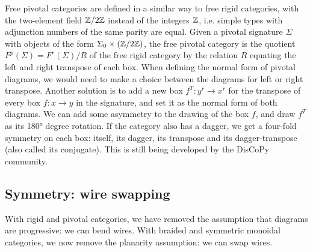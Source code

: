 Free pivotal categories are defined in a similar way to free rigid categories, with the two-element field $\mathbb{Z} / 2 \mathbb{Z}$ instead of the integers $\mathbb{Z}$, i.e. simple types with adjunction numbers of the same parity are equal.
Given a pivotal signature $\Sigma$ with objects of the form $\Sigma_0 \times (\mathbb{Z} / 2 \mathbb{Z})$, the free pivotal category is the quotient $F^p(\Sigma) = F^r(\Sigma) / R$ of the free rigid category by the relation $R$ equating the left and right transpose of each box.
When defining the normal form of pivotal diagrams, we would need to make a choice between the diagrams for left or right transpose.
Another solution is to add a new box $f^T : y^r \to x^r$ for the transpose of every box $f : x \to y$ in the signature, and set it as the normal form of both diagrams.
We can add some asymmetry to the drawing of the box $f$, and draw $f^T$ as its 180° degree rotation.
If the category also has a dagger, we get a four-fold symmetry on each box: itself, its dagger, its transpose and its dagger-transpose (also called its conjugate).
This is still being developed by the DisCoPy community.

\subsection{Symmetry: wire swapping} \label{subsection:symmetric}

With rigid and pivotal categories, we have removed the assumption that diagrams are progressive: we can bend wires.
With braided and symmetric monoidal categories, we now remove the planarity assumption: we can swap wires.


